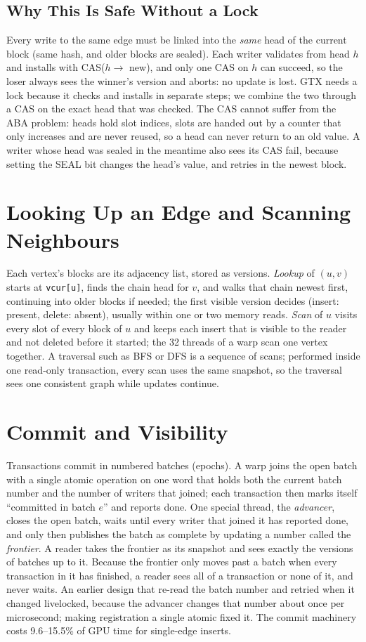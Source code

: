 \documentclass[11pt,a4paper,oneside]{report}
\newcommand{\code}[1]{\texttt{#1}}
\begin{document}
\subsection{Why This Is Safe Without a Lock}
Every write to the same edge must be linked into the \emph{same} head of the current block (same hash, and older blocks
are sealed). Each writer validates from head $h$ and installs with CAS($h \rightarrow$ new), and only one CAS on $h$
can succeed, so the loser always sees the winner's version and aborts: no update is lost. GTX needs a lock because it
checks and installs in separate steps; we combine the two through a CAS on the exact head that was checked. The CAS
cannot suffer from the ABA problem: heads hold slot indices, slots are handed out by a counter that only increases and
are never reused, so a head can never return to an old value. A writer whose head was sealed in the meantime also sees
its CAS fail, because setting the SEAL bit changes the head's value, and retries in the newest block.

\section{Looking Up an Edge and Scanning Neighbours}
Each vertex's blocks are its adjacency list, stored as versions. \emph{Lookup} of $(u,v)$ starts at \code{vcur[u]},
finds the chain head for $v$, and walks that chain newest first, continuing into older blocks if needed; the first
visible version decides (insert: present, delete: absent), usually within one or two memory reads. \emph{Scan} of $u$
visits every slot of every block of $u$ and keeps each insert that is visible to the reader and not deleted before it
started; the 32 threads of a warp scan one vertex together. A traversal such as BFS or DFS is a sequence of scans;
performed inside one read-only transaction, every scan uses the same snapshot, so the traversal sees one consistent
graph while updates continue.

\section{Commit and Visibility}
Transactions commit in numbered batches (epochs). A warp joins the open batch with a single atomic operation on one
word that holds both the current batch number and the number of writers that joined; each transaction then marks itself
``committed in batch $e$'' and reports done. One special thread, the \emph{advancer}, closes the open batch, waits until
every writer that joined it has reported done, and only then publishes the batch as complete by updating a number
called the \emph{frontier}. A reader takes the frontier as its snapshot and sees exactly the versions of batches up to
it. Because the frontier only moves past a batch when every transaction in it has finished, a reader sees all of a
transaction or none of it, and never waits. An earlier design that re-read the batch number and retried when it changed
livelocked, because the advancer changes that number about once per microsecond; making registration a single atomic
fixed it. The commit machinery costs 9.6--15.5\% of GPU time for single-edge inserts.
\end{document}
